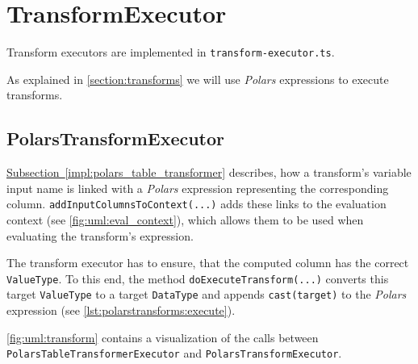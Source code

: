 \section{TransformExecutor}
\label{section:impl:transforms}
Transform executors are implemented in \Verb|transform-executor.ts|.

As explained in \autoref{section:transforms} we will use \emph{Polars} expressions to execute transforms.

\subsection{PolarsTransformExecutor}
\hyperref[impl:polars_table_transformer]{Subsection~\ref*{impl:polars_table_transformer}} describes, how a transform's variable input name is linked with a \emph{Polars} expression representing the corresponding column.
\Verb|addInputColumnsToContext(...)| adds these links to the evaluation context (see \autoref{fig:uml:eval_context}), which allows them to be used when evaluating the transform's expression.

The transform executor has to ensure, that the computed column has the correct \Verb|ValueType|.
To this end, the method \Verb|doExecuteTransform(...)| converts this target \Verb|ValueType| to a target \Verb|DataType| and appends \Verb|cast(target)| to the \emph{Polars} expression (see \autoref{lst:polarstransforms:execute}).

\autoref{fig:uml:transform} contains a visualization of the calls between \Verb|PolarsTableTransformerExecutor| and \Verb|PolarsTransformExecutor|.

